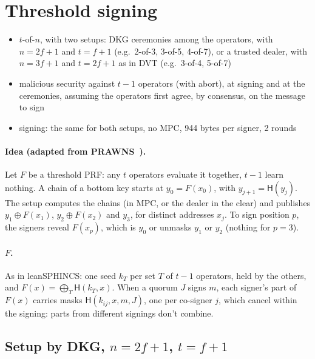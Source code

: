 \documentclass[11pt]{article}
\newcommand{\hash}{\mathsf{H}}
\begin{document}
\section{Threshold signing}

\begin{itemize}
  \item $t$-of-$n$, with two setups: DKG ceremonies among the operators, with $n=2f+1$ and $t=f+1$ (e.g.\
        2-of-3, 3-of-5, 4-of-7), or a trusted dealer, with $n=3f+1$ and $t=2f+1$ as in DVT (e.g.\ 3-of-4,
        5-of-7)
  \item malicious security against $t-1$ operators (with abort), at signing and at the ceremonies, assuming
        the operators first agree, by consensus, on the message to sign
  \item signing: the same for both setups, no MPC, 944 bytes per signer, 2 rounds
\end{itemize}

\paragraph{Idea (adapted from PRAWNS~\cite{PRAWNS}).} Let $F$ be a threshold PRF: any $t$ operators evaluate
it together, $t-1$ learn nothing. A chain of a bottom key starts at $y_0=F(x_0)$, with $y_{j+1}=\hash(y_j)$.
The setup computes the chains (in MPC, or the dealer in the clear) and publishes $y_1\oplus F(x_1)$,
$y_2\oplus F(x_2)$ and $y_3$, for distinct addresses $x_j$. To sign position $p$, the signers reveal
$F(x_p)$, which is $y_0$ or unmasks $y_1$ or $y_2$ (nothing for $p=3$).

\paragraph{$F$.} As in leanSPHINCS: one seed $k_T$ per set $T$ of $t-1$ operators, held by the others, and
$F(x)=\bigoplus_T\hash(k_T,x)$. When a quorum $J$ signs $m$, each signer's part of $F(x)$ carries masks
$\hash(k_{ij},x,m,J)$, one per co-signer $j$, which cancel within the signing: parts from different
signings don't combine.

\subsection{\texorpdfstring{Setup by DKG, $n=2f+1$, $t=f+1$}{Setup by DKG, n = 2f+1, t = f+1}}
\end{document}

